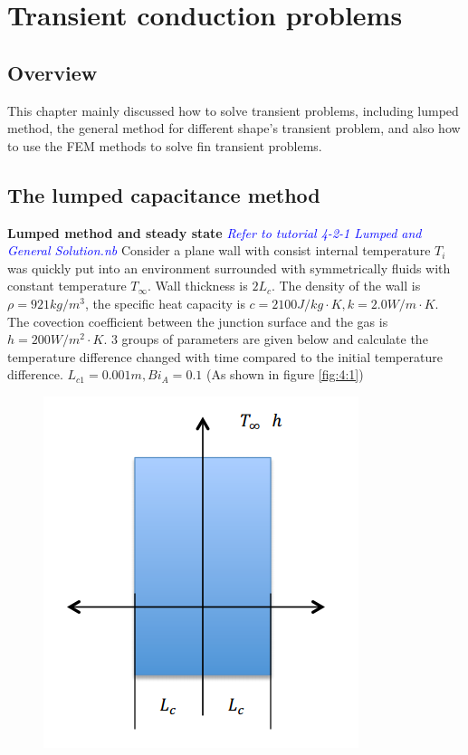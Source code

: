 \chapter{Transient conduction problems}
\section{Overview}
This chapter mainly discussed how to solve transient problems, including lumped method, the general method for different shape’s transient problem, and also how to use the FEM methods to solve fin transient problems.
\section{The lumped capacitance method}

\begin{example}
\textbf{Lumped method and steady state}
\textcolor{blue} {\emph{Refer to tutorial 4-2-1 Lumped and General Solution.nb}}
Consider a plane wall with consist internal temperature $T_i$ was quickly put into an 
environment surrounded with symmetrically fluids with constant temperature $T_\infty$. 
Wall thickness is $2L_c$. The density of the wall is $\rho=921kg/m^3 $,
the specific heat capacity is $c=2100J/kg\cdot K, k=2.0W/m\cdot K$. The covection coefficient between the junction surface and the
gas is $h=200W/m^2\cdot K$. 3 groups of parameters are given below and 
calculate the temperature difference changed with time compared to the initial temperature difference. $L_{c1}=0.001 m, Bi_A=0.1$ (As shown in figure \ref{fig:4:1})
\begin{figure}[H]
  \centering
    \includegraphics[scale=0.6]{figures/ch4/1}

\end{figure}
\end{example}
